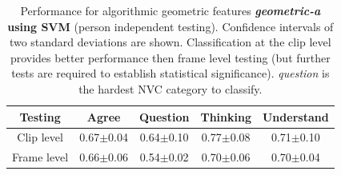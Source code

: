 \begin{table}[tb]
\centering
\caption[\ac{AUC} Performance for algorithmic geometric features \textbf{\textit{geometric-a} using SVM} (person independent testing).]{Performance for algorithmic geometric features \textbf{\textit{geometric-a} using SVM} (person independent testing). Confidence intervals of two standard deviations are shown. Classification at the clip level provides better performance then frame level testing (but further tests are required to establish statistical significance). \textit{question} is the hardest NVC category to classify.}
\begin{tabular}{ c | c | c | c | c }
\hline
Testing & Agree & Question & Thinking & Understand\\
\hline
Clip level & 0.67$\pm$0.04 & 0.64$\pm$0.10 & 0.77$\pm$0.08 & 0.71$\pm$0.10\\ %
Frame level & 0.66$\pm$0.06 & 0.54$\pm$0.02 & 0.70$\pm$0.06 & 0.70$\pm$0.04\\ %
\hline
\end{tabular}
\label{TableAlgorithmicFeatures}
\end{table}



